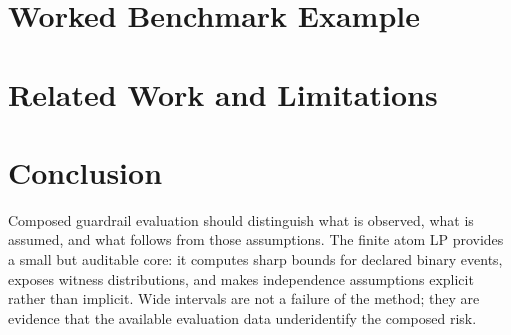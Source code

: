 \documentclass[11pt]{article}
\begin{document}
\section{Worked Benchmark Example}


\section{Related Work and Limitations}


\section{Conclusion}
Composed guardrail evaluation should distinguish what is observed, what is
assumed, and what follows from those assumptions. The finite atom LP provides a
small but auditable core: it computes sharp bounds for declared binary events,
exposes witness distributions, and makes independence assumptions explicit
rather than implicit. Wide intervals are not a failure of the method; they are
evidence that the available evaluation data underidentify the composed risk.



\end{document}
